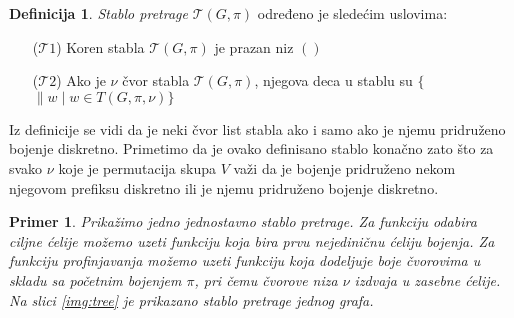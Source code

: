 \documentclass[12pt,oneside]{memoir}
\newtheorem{example}{Primer}
\theoremstyle{definition}
\newtheorem*{definition}{Definicija}
\begin{document}
  \begin{definition}
      \emph{Stablo pretrage} $\mathcal{T}(G, \pi)$ određeno je sledećim uslovima:
  
   \begin{itemize}
       \item[($\mathcal{T}1$)] Koren stabla $\mathcal{T}(G, \pi)$ je prazan niz $()$
       \item[($\mathcal{T}2$)] Ako je $\nu$ čvor stabla $\mathcal{T}(G, \pi)$, njegova deca u
     	stablu su $\{$\nu$ \| w \mid w \in T(G, \pi, \nu)\}$
   \end{itemize}
  \end{definition}

  Iz definicije se vidi da je neki čvor list stabla ako i samo ako je njemu
  pridruženo bojenje diskretno. Primetimo da je ovako definisano stablo konačno
  zato što za svako $\nu$ koje je permutacija skupa $V$ važi da je bojenje
  pridruženo nekom njegovom prefiksu diskretno ili je njemu pridruženo bojenje
  diskretno.

  \begin{example}
	  Prikažimo jedno jednostavno stablo pretrage. Za funkciju odabira ciljne
	  ćelije možemo uzeti funkciju koja bira prvu nejediničnu ćeliju bojenja.
	  Za funkciju profinjavanja možemo uzeti funkciju koja dodeljuje boje
	  čvorovima u skladu sa početnim bojenjem $\pi$, pri čemu čvorove niza
	  $\nu$ izdvaja u zasebne ćelije. Na slici \ref{img:tree} je prikazano
	  stablo pretrage jednog grafa.
  \end{example}
\end{document}
